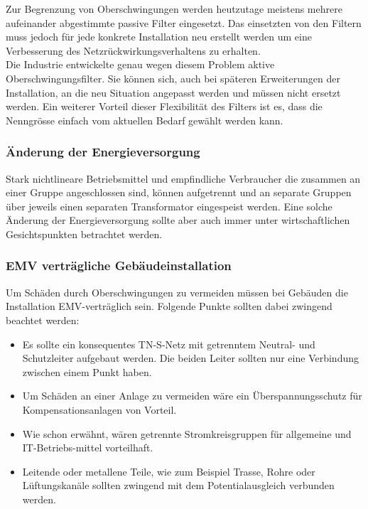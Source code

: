 Zur Begrenzung von Oberschwingungen werden heutzutage  meistens mehrere aufeinander abgestimmte passive Filter eingesetzt. Das einsetzten von den Filtern muss jedoch für jede konkrete Installation neu erstellt werden um eine Verbesserung des Netzrückwirkungsverhaltens zu erhalten.\\
Die Industrie entwickelte genau wegen diesem Problem aktive Oberschwingungsfilter. Sie können sich, auch bei späteren Erweiterungen der Installation, an die neu Situation angepasst werden und müssen nicht ersetzt werden. Ein weiterer Vorteil dieser Flexibilität des Filters ist es, dass die Nenngrösse einfach vom aktuellen Bedarf gewählt werden kann.     

\subsubsection{Änderung der Energieversorgung}

Stark nichtlineare Betriebsmittel und empfindliche Verbraucher die zusammen an einer Gruppe angeschlossen sind, können aufgetrennt und an separate Gruppen über jeweils einen separaten Transformator eingespeist werden. Eine solche Änderung der Energieversorgung sollte aber auch immer unter wirtschaftlichen Gesichtspunkten betrachtet werden.

\subsubsection{EMV verträgliche Gebäudeinstallation}

Um Schäden durch Oberschwingungen zu vermeiden müssen bei Gebäuden die Installation EMV-verträglich sein.
Folgende Punkte sollten dabei zwingend beachtet werden:

\begin{itemize}
	\item Es sollte ein konsequentes TN-S-Netz mit getrenntem Neutral- und Schutzleiter aufgebaut werden. Die beiden Leiter sollten nur eine Verbindung zwischen einem Punkt haben.
	\item Um Schäden an einer Anlage zu vermeiden wäre ein Überspannungsschutz für Kompensationsanlagen von Vorteil.
	\item Wie schon erwähnt, wären getrennte Stromkreisgruppen für allgemeine und IT-Betriebs-mittel vorteilhaft.
	\item Leitende oder metallene Teile, wie zum Beispiel Trasse, Rohre oder Lüftungskanäle sollten zwingend mit dem Potentialausgleich verbunden werden.
	
\end{itemize}

